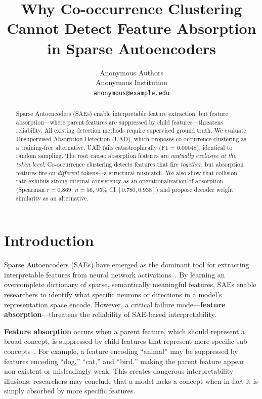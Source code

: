 \documentclass{article}
\title{Why Co-occurrence Clustering Cannot Detect Feature Absorption in Sparse Autoencoders}
\author{%
  Anonymous Authors\\
  Anonymous Institution\\
  \texttt{anonymous@example.edu}
}
\begin{document}
\maketitle

\begin{abstract}
Sparse Autoencoders (SAEs) enable interpretable feature extraction, but feature absorption---where parent features are suppressed by child features---threatens reliability. All existing detection methods require supervised ground truth. We evaluate Unsupervised Absorption Detection (UAD), which proposes co-occurrence clustering as a training-free alternative. UAD fails catastrophically (F1 = 0.00048), identical to random sampling. The root cause: absorption features are \emph{mutually exclusive at the token level}. Co-occurrence clustering detects features that fire \emph{together}, but absorption features fire on \emph{different} tokens---a structural mismatch. We also show that collision rate exhibits strong internal consistency as an operationalization of absorption (Spearman $r = 0.869$, $n = 56$, 95\% CI $[0.780, 0.938]$) and propose decoder weight similarity as an alternative.
\end{abstract}

\section{Introduction}

Sparse Autoencoders (SAEs) have emerged as the dominant tool for extracting interpretable features from neural network activations~\citep{bricken2023monosemanticity, cunningham2023sparse}. By learning an overcomplete dictionary of sparse, semantically meaningful features, SAEs enable researchers to identify what specific neurons or directions in a model's representation space encode. However, a critical failure mode---\textbf{feature absorption}---threatens the reliability of SAE-based interpretability.

\textbf{Feature absorption} occurs when a parent feature, which should represent a broad concept, is suppressed by child features that represent more specific sub-concepts~\citep{chanin2024absorption}. For example, a feature encoding ``animal'' may be suppressed by features encoding ``dog,'' ``cat,'' and ``bird,'' making the parent feature appear non-existent or misleadingly weak. This creates dangerous interpretability illusions: researchers may conclude that a model lacks a concept when in fact it is simply absorbed by more specific features.
\end{document}
